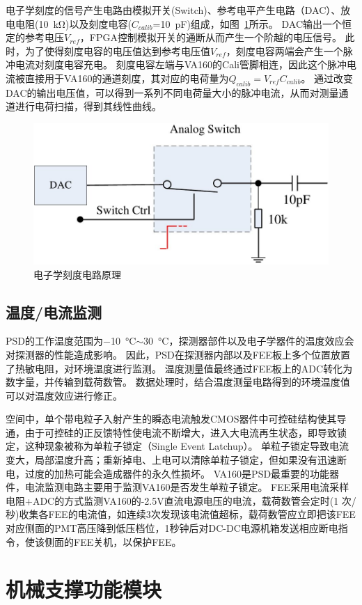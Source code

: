 电子学刻度的信号产生电路由模拟开关(Switch)、参考电平产生电路（DAC）、放电电阻(\SI{10}{\kilo\ohm})以及刻度电容($C_{calib}$=\SI{10}{\pico\farad})组成，如图~\ref{fig:ch2:fee_calibration}所示。
DAC输出一个恒定的参考电压$V_{ref}$，FPGA控制模拟开关的通断从而产生一个阶越的电压信号。
此时，为了使得刻度电容的电压值达到参考电压值$V_{ref}$，刻度电容两端会产生一个脉冲电流对刻度电容充电。
刻度电容左端与VA160的Cali管脚相连，因此这个脉冲电流被直接用于VA160的通道刻度，其对应的电荷量为$Q_{calib}=V_{ref}C_{calib}$。
通过改变DAC的输出电压值，可以得到一系列不同电荷量大小的脉冲电流，从而对测量通道进行电荷扫描，得到其线性曲线。

\begin{figure}
\centering
\includegraphics[width=0.7\linewidth]{chap/description/fig/fee_calibration}
\caption{电子学刻度电路原理}
\label{fig:ch2:fee_calibration}
\end{figure}


\subsection{温度/电流监测}
PSD的工作温度范围为\SI{-10}{\celsius}$\sim$\SI{30}{\celsius}，探测器部件以及电子学器件的温度效应会对探测器的性能造成影响。
因此，PSD在探测器内部以及FEE板上多个位置放置了热敏电阻，对环境温度进行监测。
温度测量值最终通过FEE板上的ADC转化为数字量，并传输到载荷数管。
数据处理时，结合温度测量电路得到的环境温度值可以对温度效应进行修正。

空间中，单个带电粒子入射产生的瞬态电流触发CMOS器件中可控硅结构使其导通，由于可控硅的正反馈特性使电流不断增大，进入大电流再生状态，即导致锁定，这种现象被称为单粒子锁定（Single Event Latchup）。
单粒子锁定导致电流变大，局部温度升高；重新掉电、上电可以清除单粒子锁定，但如果没有迅速断电，过度的加热可能会造成器件的永久性损坏。
VA160是PSD最重要的功能器件，电流监测电路主要用于监测VA160是否发生单粒子锁定。
FEE采用电流采样电阻+ADC的方式监测VA160的-2.5V直流电源电压的电流，载荷数管会定时(1 次/秒)收集各FEE的电流值，如连续3次发现该电流值超标，载荷数管应立即把该FEE对应侧面的PMT高压降到低压档位，1秒钟后对DC-DC电源机箱发送相应断电指令，使该侧面的FEE关机，以保护FEE。


\section{机械支撑功能模块}
\label{sec:psd_support}


